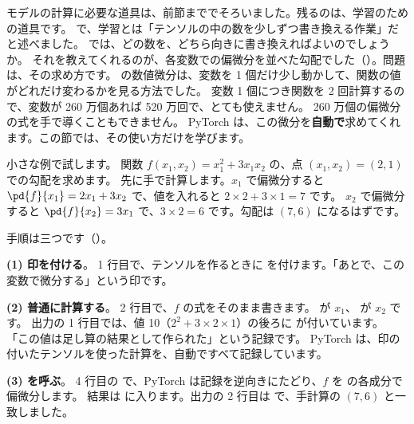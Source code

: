 モデルの計算に必要な道具は、前節まででそろいました。残るのは、学習のための道具です。
で、学習とは「テンソルの中の数を少しずつ書き換える作業」だと述べました。
では、どの数を、どちら向きに書き換えればよいのでしょうか。
それを教えてくれるのが、各変数での偏微分を並べた勾配でした（）。問題は、その求め方です。
の数値微分は、変数を 1 個だけ少し動かして、関数の値がどれだけ変わるかを見る方法でした。
変数 1 個につき関数を 2 回計算するので、変数が 260 万個あれば 520 万回で、とても使えません。
260 万個の偏微分の式を手で導くこともできません。
PyTorch は、この微分を\textbf{自動で}求めてくれます。この節では、その使い方だけを学びます。

小さな例で試します。
関数 $f(x_1,x_2)=x_1^{2}+3x_1x_2$ の、点 $(x_1,x_2)=(2,1)$ での勾配を求めます。
先に手で計算します。$x_1$ で偏微分すると $\pd{f}{x_1}=2x_1+3x_2$ で、値を入れると $2\times 2+3\times 1=7$ です。
$x_2$ で偏微分すると $\pd{f}{x_2}=3x_1$ で、$3\times 2=6$ です。勾配は $(7,6)$ になるはずです。



手順は三つです（）。

\textbf{(1) 印を付ける}。
1 行目で、テンソルを作るときに  を付けます。「あとで、この変数で微分する」という印です。

\textbf{(2) 普通に計算する}。
2 行目で、$f$ の式をそのまま書きます。 が $x_1$、 が $x_2$ です。
出力の 1 行目では、値 10（$2^{2}+3\times 2\times 1$）の後ろに  が付いています。
「この値は足し算の結果として作られた」という記録です。
PyTorch は、印の付いたテンソルを使った計算を、自動ですべて記録しています。

\textbf{(3)  を呼ぶ}。
4 行目の  で、PyTorch は記録を逆向きにたどり、$f$ を  の各成分で偏微分します。
結果は  に入ります。出力の 2 行目は  で、手計算の $(7,6)$ と一致しました。

